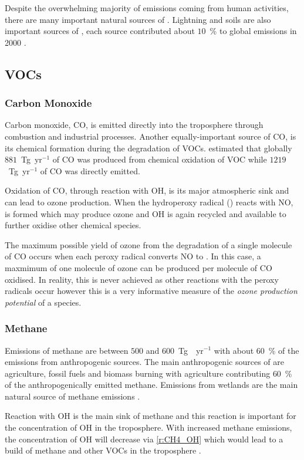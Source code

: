 Despite the overwhelming majority of  emissions coming from human activities, there are many important natural sources of .
Lightning and soils are also important sources of , each source contributed about $10$~\% to global  emissions in 2000 \citep{Seinfeld:2006}.

\subsection{VOCs}
\subsubsection{Carbon Monoxide}
Carbon monoxide, CO, is emitted directly into the troposphere through combustion and industrial processes.
Another equally-important source of CO, is its chemical formation during the degradation of VOCs.
\citet{Hauglustaine:1998} estimated that globally $881$~Tg~yr$^{-1}$ of CO was produced from chemical oxidation of VOC while $1219$~Tg~yr$^{-1}$ of CO was directly emitted.

Oxidation of CO, through reaction with OH, is its major atmospheric sink and can lead to ozone production.
When the hydroperoxy radical () reacts with NO,  is formed which may produce ozone and OH is again recycled and available to further oxidise other chemical species.

The maximum possible yield of ozone from the degradation of a single molecule of CO occurs when each peroxy radical converts NO to .
In this case, a maxmimum of one molecule of ozone can be produced per molecule of CO oxidised.
In reality, this is never achieved as other reactions with the peroxy radicals occur however this is a very informative measure of the \emph{ozone production potential} of a species.

\subsubsection{Methane}
Emissions of methane are between $500$ and $600$~Tg~~yr$^{-1}$ with about $60$~\% of the emissions from anthropogenic sources.
The main anthropogenic sources of  are agriculture, fossil fuels and biomass burning with agriculture contributing $60$~\% of the anthropogenically emitted methane.
Emissions from wetlands are the main natural source of methane emissions \citep{Kirschke:2013}.

Reaction with OH is the main sink of methane and this reaction is important for the concentration of OH in the troposphere.
With increased methane emissions, the concentration of OH will decrease via \eqref{r:CH4_OH} which would lead to a build of methane and other VOCs in the troposphere \citep{Holmes:2013}.

